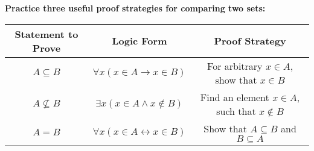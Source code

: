 \documentclass[12pt, oneside]{article}
\begin{document}
\newpage

{\bf Practice three useful proof strategies for comparing two sets:}

\begin{center}
\begin{tabular}{c|c|c}
{\bf  Statement to Prove} & {\bf Logic Form} &{\bf Proof Strategy}\\
\hline 
$A \subseteq B$ & $\forall x  (x \in A  \to x  \in B)$ &For arbitrary $x \in A$, show that $x \in B$ \\
$A \nsubseteq B$ &$\exists x  (x \in A  \land x  \notin B) $ & Find an element $x \in A$, such that $x \notin B$ \\
$A = B$ & $\forall x  ( x\in A \leftrightarrow x \in B)$ & Show that $A \subseteq B$ and $B \subseteq A$ \\
\end{tabular}
\end{center}
\end{document}
